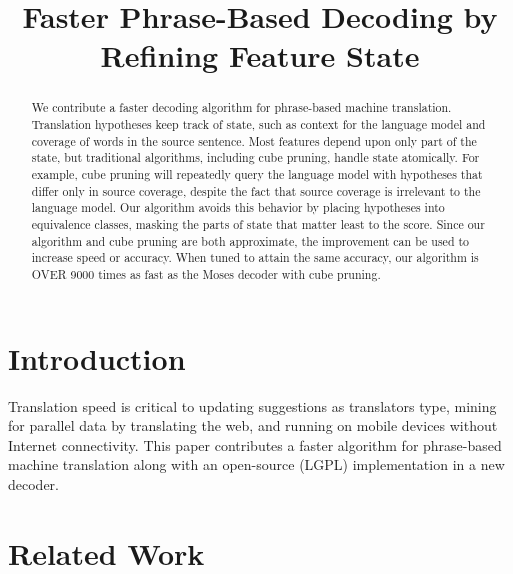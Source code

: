 \documentclass[11pt]{article}
\title{Faster Phrase-Based Decoding by Refining Feature State}
\author{}
\date{}
\begin{document}
\maketitle
\begin{abstract}
We contribute a faster decoding algorithm for phrase-based machine translation.  Translation hypotheses keep track of state, such as context for the language model and coverage of words in the source sentence.  Most features depend upon only part of the state, but traditional algorithms, including cube pruning, handle state atomically.  For example, cube pruning will repeatedly query the language model with hypotheses that differ only in source coverage, despite the fact that source coverage is irrelevant to the language model.  
Our algorithm avoids this behavior by placing hypotheses into equivalence classes, masking the parts of state that matter least to the score.  
Since our algorithm and cube pruning are both approximate, the improvement can be used to increase speed or accuracy.  
When tuned to attain the same accuracy, our algorithm is OVER 9000 times as fast as the Moses decoder with cube pruning.  
\end{abstract}

\section{Introduction}
Translation speed is critical to updating suggestions as translators type, mining for parallel data by translating the web, and running on mobile devices without Internet connectivity.  This paper contributes a faster algorithm for phrase-based machine translation along with an open-source (LGPL) implementation in a new decoder.  

\section{Related Work}
\end{document}
